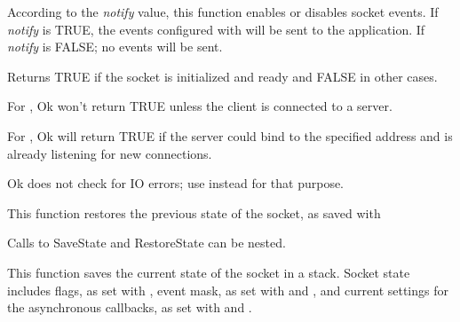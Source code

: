 %
%
\label{wxsocketbasenotify}


According to the {\it notify} value, this function enables
or disables socket events. If {\it notify} is TRUE, the events
configured with  will
be sent to the application. If {\it notify} is FALSE; no events
will be sent.

% 
%
\label{wxsocketbaseok}


Returns TRUE if the socket is initialized and ready and FALSE in other
cases.


For , Ok won't return TRUE unless
the client is connected to a server.

For , Ok will return TRUE if the
server could bind to the specified address and is already listening for
new connections.

Ok does not check for IO errors; use 
instead for that purpose.

%
%
\label{wxsocketbaserestorestate}


This function restores the previous state of the socket, as saved
with 

Calls to SaveState and RestoreState can be nested.



%
%
\label{wxsocketbasesavestate}


This function saves the current state of the socket in a stack. Socket
state includes flags, as set with ,
event mask, as set with  and
, and current settings for the
asynchronous callbacks, as set with 
and .

